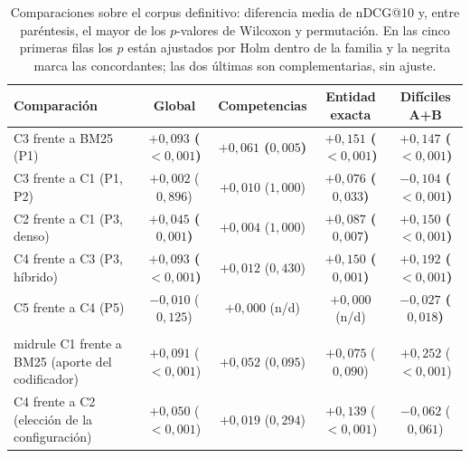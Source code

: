 \begin{table}[htbp]
\centering
\footnotesize
\setlength{\tabcolsep}{5pt}
\renewcommand{\arraystretch}{1.25}
\caption{Comparaciones sobre el corpus definitivo: diferencia media de nDCG@10 y, entre paréntesis, el mayor de los $p$-valores de Wilcoxon y permutación. En las cinco primeras filas los $p$ están ajustados por Holm dentro de la familia y la negrita marca las concordantes; las dos últimas son complementarias, sin ajuste.}
\label{tab:final-stats}
\begin{tabularx}{\textwidth}{@{}l C C C C@{}}
\toprule
\textbf{Comparación} & \textbf{Global} & \textbf{Competencias} & \textbf{Entidad exacta} & \textbf{Difíciles A+B} \\
\midrule
C3 frente a BM25 (P1) & {\boldmath\bfseries $+0{,}093$ ($<\!0{,}001$)} & {\boldmath\bfseries $+0{,}061$ ($0{,}005$)} & {\boldmath\bfseries $+0{,}151$ ($<\!0{,}001$)} & {\boldmath\bfseries $+0{,}147$ ($<\!0{,}001$)} \\
C3 frente a C1 (P1, P2) & $+0{,}002$ ($0{,}896$) & $+0{,}010$ ($1{,}000$) & {\boldmath\bfseries $+0{,}076$ ($0{,}033$)} & {\boldmath\bfseries $-0{,}104$ ($<\!0{,}001$)} \\
C2 frente a C1 (P3, denso) & {\boldmath\bfseries $+0{,}045$ ($0{,}001$)} & $+0{,}004$ ($1{,}000$) & {\boldmath\bfseries $+0{,}087$ ($0{,}007$)} & {\boldmath\bfseries $+0{,}150$ ($<\!0{,}001$)} \\
C4 frente a C3 (P3, híbrido) & {\boldmath\bfseries $+0{,}093$ ($<\!0{,}001$)} & $+0{,}012$ ($0{,}430$) & {\boldmath\bfseries $+0{,}150$ ($0{,}001$)} & {\boldmath\bfseries $+0{,}192$ ($<\!0{,}001$)} \\
C5 frente a C4 (P5) & $-0{,}010$ ($0{,}125$) & $+0{,}000$ (n/d) & $+0{,}000$ (n/d) & {\boldmath\bfseries $-0{,}027$ ($0{,}018$)} \\
\\midrule C1 frente a BM25 (aporte del codificador) & $+0{,}091$ ($<\!0{,}001$) & $+0{,}052$ ($0{,}095$) & $+0{,}075$ ($0{,}090$) & $+0{,}252$ ($<\!0{,}001$) \\
C4 frente a C2 (elección de la configuración) & $+0{,}050$ ($<\!0{,}001$) & $+0{,}019$ ($0{,}294$) & $+0{,}139$ ($<\!0{,}001$) & $-0{,}062$ ($0{,}061$) \\
\bottomrule
\end{tabularx}
\end{table}

